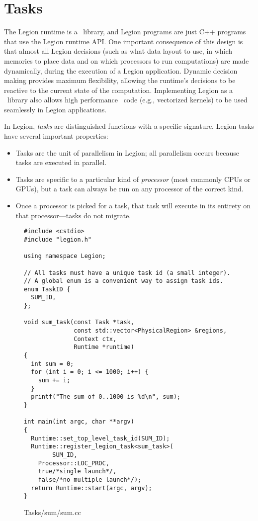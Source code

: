 \chapter{Tasks}
\label{chap:tasks}

The Legion runtime is a \Cpp\ library, and
Legion programs are just C++ programs that use the Legion runtime API.
One important consequence of this design is that almost all Legion decisions
(such as what data layout to use, in which memories to place data and on which
processors to run computations) are made dynamically,  during the execution of 
a Legion application.  Dynamic decision making provides maximum flexibility, 
allowing the runtime's decisions to be reactive to the current state of the computation.
Implementing Legion as a \Cpp\ library also allows high performance \Cpp\ code
(e.g., vectorized kernels) to be used seamlessly in Legion applications.

In Legion, {\em tasks} are distinguished functions with a specific signature.
Legion tasks have several important properties:
\begin{itemize}
\item Tasks are the unit of parallelism in Legion; all parallelism occurs because tasks are executed in parallel.

\item Tasks are specific to a particular kind of {\em processor} (most commonly CPUs or GPUs), but a task can always be run on any processor
of the correct kind.

\item Once a processor is picked for a task, that task will execute in its entirety on that processor---tasks do
not migrate.  

\end{itemize}


\begin{figure}
\begin{lstlisting}
#include <cstdio>
#include "legion.h"

using namespace Legion;

// All tasks must have a unique task id (a small integer).
// A global enum is a convenient way to assign task ids.
enum TaskID {
  SUM_ID,
};

void sum_task(const Task *task,
              const std::vector<PhysicalRegion> &regions,
              Context ctx, 
              Runtime *runtime)
{
  int sum = 0;
  for (int i = 0; i <= 1000; i++) {
    sum += i;
  }
  printf("The sum of 0..1000 is %d\n", sum);
}

int main(int argc, char **argv)
{
  Runtime::set_top_level_task_id(SUM_ID);
  Runtime::register_legion_task<sum_task>(
        SUM_ID,
	Processor::LOC_PROC, 
	true/*single launch*/, 
	false/*no multiple launch*/);
  return Runtime::start(argc, argv);
}
\end{lstlisting}
\caption{Tasks/sum/sum.cc}
\label{fig:simple}
\end{figure}


